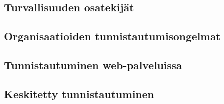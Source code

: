 
\subsection{Turvallisuuden osatekijät}

\subsection{Organisaatioiden tunnistautumisongelmat}

\subsection{Tunnistautuminen web-palveluissa}

\subsection{Keskitetty tunnistautuminen}
